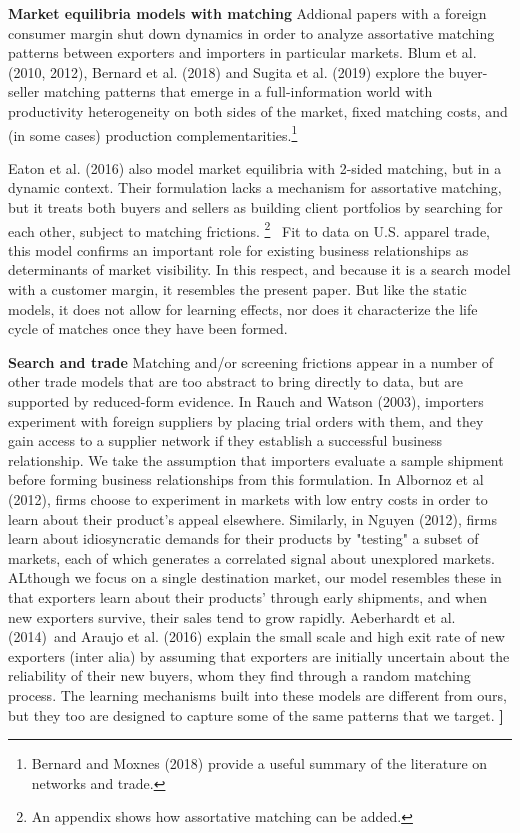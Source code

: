 \documentclass[12pt]{article}
\begin{document}
\textbf{Market equilibria models with matching }Addional papers with a
foreign consumer margin shut down dynamics in order to analyze assortative
matching patterns between exporters and importers in particular markets.
Blum et al. (2010, 2012), Bernard et al. (2018) and Sugita et al. (2019)
explore the buyer-seller matching patterns that emerge in a full-information
world with productivity heterogeneity on both sides of the market, fixed
matching costs, and (in some cases) production complementarities.\footnote{%
Bernard and Moxnes (2018) provide a useful summary of the literature on
networks and trade.}

Eaton et al. (2016) also model market equilibria with 2-sided matching, but
in a dynamic context. Their formulation lacks a mechanism for assortative
matching, but it treats both buyers and sellers as building client
portfolios by searching for each other, subject to matching frictions.%
\footnote{%
An appendix shows how assortative matching can be added.} \ Fit to data on
U.S. apparel trade, this model confirms an important role for existing
business relationships as determinants of market visibility. In this
respect, and because it is a search model with a customer margin, it
resembles the present paper. But like the static models, it does not allow
for learning effects, nor does it characterize the life cycle of matches
once they have been formed.

\textbf{Search and trade} Matching and/or screening frictions appear in a
number of other trade models that are too abstract to bring directly to
data, but are supported by reduced-form evidence. In Rauch and Watson
(2003), importers experiment with foreign suppliers by placing trial orders
with them, and they gain access to a supplier network if they establish a
successful business relationship. We take the assumption that importers
evaluate a sample shipment before forming business relationships from this
formulation. In Albornoz et al (2012), firms choose to experiment in markets
with low entry costs in order to learn about their product's appeal
elsewhere. Similarly, in Nguyen (2012), firms learn about idiosyncratic
demands for their products by "testing" a subset of markets, each of which
generates a correlated signal about unexplored markets. ALthough we focus on
a single destination market, our model resembles these in that exporters
learn about their products' through early shipments, and when new exporters
survive, their sales tend to grow rapidly. Aeberhardt et al. (2014)\ and
Araujo et al. (2016) explain the small scale and high exit rate of new
exporters (inter alia) by assuming that exporters are initially uncertain
about the reliability of their new buyers, whom they find through a random
matching process. The learning mechanisms built into these models are
different from ours, but they too are designed to capture some of the same
patterns that we target. \textbf{]}
\end{document}
